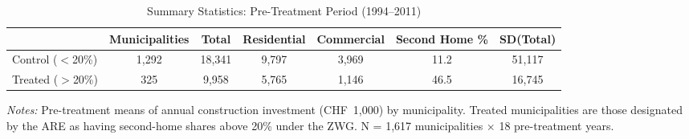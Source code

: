 \begin{table}[H]
\centering
\caption{Summary Statistics: Pre-Treatment Period (1994--2011)}
\label{tab:summary}
\begin{threeparttable}
\footnotesize
\begin{tabular}{lcccccc}
\toprule
 & Municipalities & Total & Residential & Commercial & Second Home \% & SD(Total) \\
\midrule
Control ($<$20\%) & 1,292 & 18,341 & 9,797 & 3,969 & 11.2 & 51,117 \\
Treated ($>$20\%) & 325 & 9,958 & 5,765 & 1,146 & 46.5 & 16,745 \\
\bottomrule
\end{tabular}
\begin{tablenotes}[flushleft]
\small
\item \textit{Notes:} Pre-treatment means of annual construction investment (CHF~1,000) by municipality. Treated municipalities are those designated by the ARE as having second-home shares above 20\% under the ZWG. N = 1,617 municipalities $\times$ 18 pre-treatment years.
\end{tablenotes}
\end{threeparttable}
\end{table}

